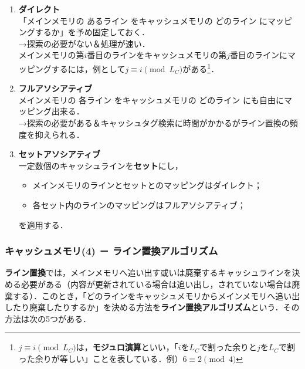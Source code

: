 \begin{enumerate}[label=\textbf{(\Alph*)}, labelsep=10pt, leftmargin=23pt]
	\item \textbf{ダイレクト}\\
		「メインメモリの あるライン をキャッシュメモリの どのライン にマッピングするか」を予め固定しておく．\\
		→\textsf{探索の必要がない＆処理が速い．}\\
		メインメモリの第$i$番目のラインをキャッシュメモリの第$j$番目のラインにマッピングするには，例として$j \equiv i\pmod L_C$がある\footnote{$j \equiv i\pmod L_C$は，\textbf{モジュロ演算}といい，「$i$を$L_C$で割った余りと$j$を$L_C$で割った余りが等しい」ことを表している．例）$6 \equiv 2\pmod 4$}．
	\item \textbf{フルアソシアティブ}\\
		メインメモリの 各ライン をキャッシュメモリの どのライン にも自由にマッピング出来る．\\
		→探索の必要がある＆キャッシュタグ検索に時間がかかるがライン置換の頻度を抑えられる．
	\item \textbf{セットアソシアティブ}\\
		一定数個のキャッシュラインを\textbf{セット}にし，
		\begin{itemize}
			\item メインメモリのラインとセットとのマッピングはダイレクト；
			\item 各セット内のラインのマッピングはフルアソシアティブ；
		\end{itemize}
		を適用する．
\end{enumerate}



\subsubsection{キャッシュメモリ(4) － ライン置換アルゴリズム}\label{sec27-2-D-12}

\textbf{ライン置換}では，メインメモリへ追い出す或いは廃棄するキャッシュラインを決める必要がある（内容が更新されている場合は追い出し，されていない場合は廃棄する）．このとき，「どのラインをキャッシュメモリからメインメモリへ追い出したり廃棄したりするか」を決める方法を\textbf{ライン置換アルゴリズム}という．その方法は次の5つがある．

